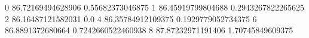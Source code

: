 0 86.72169494628906 0.55682373046875
1 86.45919799804688 0.2943267822265625
2 86.16487121582031 0.0
4 86.35784912109375 0.1929779052734375
6 86.8891372680664 0.7242660522460938
8 87.87232971191406 1.70745849609375
